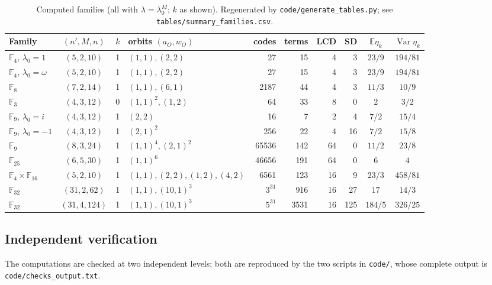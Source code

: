 \documentclass[11pt,a4paper]{article}
\newcommand{\F}{\mathbb F}
\numberwithin{equation}{section}
\theoremstyle{plain}
\theoremstyle{definition}
\theoremstyle{remark}
\begin{document}
\begin{table}[htbp]
\centering
\footnotesize
\setlength{\tabcolsep}{3pt}
\caption{Computed families (all with $\lambda=\lambda_0^M$; $k$ as shown).
Regenerated by \texttt{code/generate\_tables.py}; see
\texttt{tables/summary\_families.csv}.}
\label{tab:summary}
\begin{tabular}{lcclrrrrcc}
\toprule
Family & $(n',M,n)$ & $k$ & orbits $(a_O,w_O)$ & codes & terms & LCD & SD &
$\mathbb{E}\eta_k$ & $\operatorname{Var}\eta_k$\\
\midrule
$\F_4$, $\lambda_0{=}1$ & $(5,2,10)$ & 1 & $(1,1),(2,2)$ & 27 & 15 & 4 & 3 & $23/9$ & $194/81$\\
$\F_4$, $\lambda_0{=}\omega$ & $(5,2,10)$ & 1 & $(1,1),(2,2)$ & 27 & 15 & 4 & 3 & $23/9$ & $194/81$\\
$\F_8$ & $(7,2,14)$ & 1 & $(1,1),(6,1)$ & 2187 & 44 & 4 & 3 & $11/3$ & $10/9$\\
$\F_3$ & $(4,3,12)$ & 0 & $(1,1)^2,(1,2)$ & 64 & 33 & 8 & 0 & $2$ & $3/2$\\
$\F_9$, $\lambda_0{=}i$ & $(4,3,12)$ & 1 & $(2,2)$ & 16 & 7 & 2 & 4 & $7/2$ & $15/4$\\
$\F_9$, $\lambda_0{=}-1$ & $(4,3,12)$ & 1 & $(2,1)^2$ & 256 & 22 & 4 & 16 & $7/2$ & $15/8$\\
$\F_9$ & $(8,3,24)$ & 1 & $(1,1)^4,(2,1)^2$ & 65536 & 142 & 64 & 0 & $11/2$ & $23/8$\\
$\F_{25}$ & $(6,5,30)$ & 1 & $(1,1)^6$ & 46656 & 191 & 64 & 0 & $6$ & $4$\\
$\F_4{\times}\F_{16}$ & $(5,2,10)$ & 1 & $(1,1),(2,2),(1,2),(4,2)$ & 6561 & 123 & 16 & 9 & $23/3$ & $458/81$\\
$\F_{32}$ & $(31,2,62)$ & 1 & $(1,1),(10,1)^3$ & $3^{31}$ & 916 & 16 & 27 & $17$ & $14/3$\\
$\F_{32}$ & $(31,4,124)$ & 1 & $(1,1),(10,1)^3$ & $5^{31}$ & 3531 & 16 & 125 & $184/5$ & $326/25$\\
\bottomrule
\end{tabular}
\end{table}


\subsection{Independent verification}\label{sec:verification}

The computations are checked at two independent levels; both are reproduced
by the two scripts in \texttt{code/}, whose complete output is
\texttt{code/checks\_output.txt}.
\end{document}
